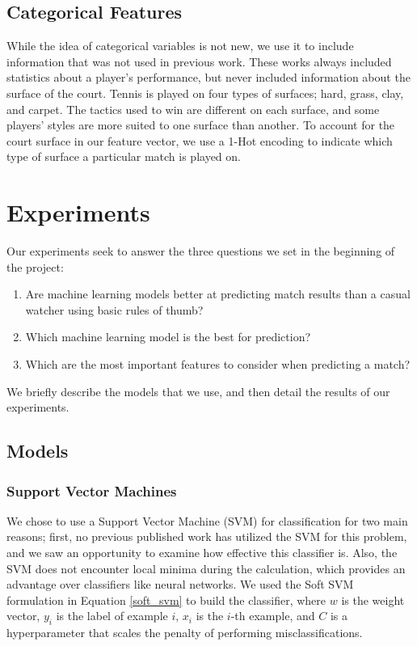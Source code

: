\documentclass[conference]{IEEEtran}
\begin{document}
	\subsection{Categorical Features}
	While the idea of categorical variables is not new, we use it to include information that was not used in previous work. These works always included statistics about a player's performance, but never included information about the surface of the court. Tennis is played on four types of surfaces; hard, grass, clay, and carpet. The tactics used to win are different on each surface, and some players' styles are more suited to one surface than another. To account for the court surface in our feature vector, we use a 1-Hot encoding to indicate which type of surface a particular match is played on.

\section{Experiments}
Our experiments seek to answer the three questions we set in the beginning of the project:

	\begin{enumerate}
		\item Are machine learning models better at predicting match results than a casual watcher using basic rules of thumb?
		\item Which machine learning model is the best for prediction?
		\item Which are the most important features to consider when predicting a match?
	\end{enumerate}

We briefly describe the models that we use, and then detail the results of our experiments.

	\subsection{Models}

		\subsubsection{Support Vector Machines}
		We chose to use a Support Vector Machine (SVM) for classification for two main reasons; first, no previous published work has utilized the SVM for this problem, and we saw an opportunity to examine how effective this classifier is. Also, the SVM does not encounter local minima during the calculation, which provides an advantage over classifiers like neural networks. We used the Soft SVM formulation in Equation \ref{soft_svm} to build the classifier, where $w$ is the weight vector, $y_{i}$ is the label of example $i$, $x_{i}$ is the $i$-th example, and $C$ is a hyperparameter that scales the penalty of performing misclassifications.
\end{document}
